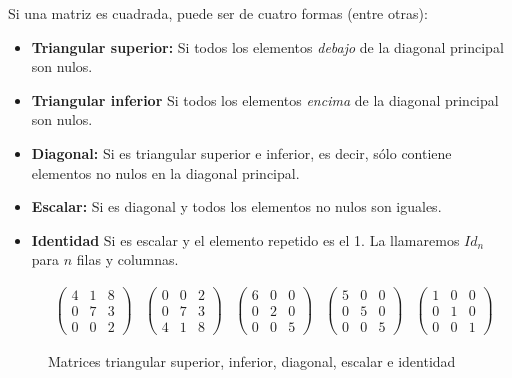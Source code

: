 Si una matriz es cuadrada, puede ser de cuatro formas (entre otras):

\begin{itemize}
	\item\textbf{Triangular superior:}
		Si todos los elementos \textit{debajo} de la diagonal principal son nulos.
	\item\textbf{Triangular inferior}
		Si todos los elementos \textit{encima} de la diagonal principal son nulos.
	\item\textbf{Diagonal:}
		Si es triangular superior e inferior, es decir, sólo contiene elementos no nulos en la diagonal principal.
	\item\textbf{Escalar:}
		Si es diagonal y todos los elementos no nulos son iguales.
	\item\textbf{Identidad}
		Si es escalar y el elemento repetido es el 1.
		La llamaremos $Id_n$ para $n$ filas y columnas.
\end{itemize}

\begin{figure}[h!]
\[
	\begin{array}{ccccc}
		\begin{pmatrix}
			4 & 1 & 8 \\
			0 & 7 & 3 \\
			0 & 0 & 2
		\end{pmatrix}

		&

		\begin{pmatrix}
			0 & 0 & 2 \\
			0 & 7 & 3 \\
			4 & 1 & 8
		\end{pmatrix}

		&

		\begin{pmatrix}
			6 & 0 & 0 \\
			0 & 2 & 0 \\
			0 & 0 & 5
		\end{pmatrix}

		&

		\begin{pmatrix}
			5 & 0 & 0 \\
			0 & 5 & 0 \\
			0 & 0 & 5
		\end{pmatrix}

		&

		\begin{pmatrix}
			1 & 0 & 0 \\
			0 & 1 & 0 \\
			0 & 0 & 1
		\end{pmatrix}
	\end{array}
\]
\caption{Matrices triangular superior, inferior, diagonal, escalar e identidad}
\end{figure}

